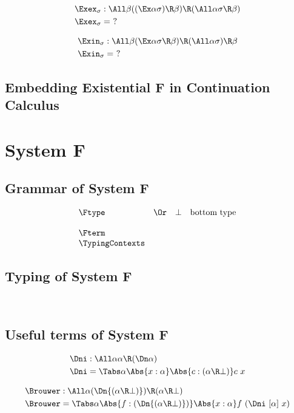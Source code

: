 \documentclass{amsart}
\begin{document}
\begin{align*}
\Exex_\sigma & : \All\beta
  ((\Ex\alpha \sigma) \R \beta) \R
  (\All\alpha \sigma \R \beta)
  \\
\Exex_\sigma & = ~?
\end{align*}

\begin{align*}
\Exin_\sigma & : \All\beta
  (\Ex\alpha \sigma \R \beta) \R
  (\All\alpha\sigma) \R \beta
  \\
\Exin_\sigma & = ~?
\end{align*}

\subsection{Embedding Existential F in Continuation Calculus}
\label{sec:desugar}

\section{System F}

\subsection{Grammar of System F}

\[
\begin{array}{lclr}
\Ftype
&\Or& \bot & \mbox{bottom type} \\
\\
\Fterm
\\
\TypingContexts
\end{array}
\]

\subsection{Typing of System F}
~

\FRules

\subsection{Useful terms of System F}
\label{sec:f-terms}

\begin{align*}
\Dni & : \All\alpha \alpha \R (\Dn\alpha) \\
\Dni & = \Tabs\alpha \Abs{x:\alpha}
           \Abs{c : (\alpha \R \bot)} c~x
\end{align*}

\begin{align*}
\Brouwer & : \All\alpha (\Dn{(\alpha\R\bot)}) \R (\alpha \R \bot) \\
\Brouwer & = \Tabs\alpha \Abs{f:(\Dn{(\alpha\R\bot)})}
           \Abs{x:\alpha} f~(\Dni~[\alpha]~x)
\end{align*}
\end{document}
